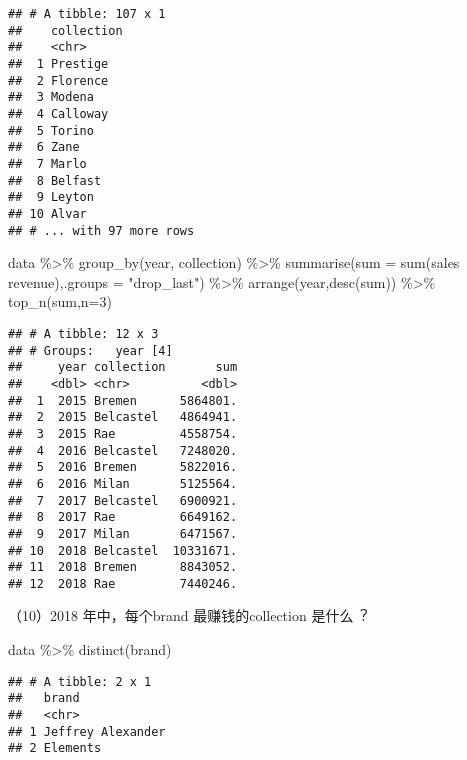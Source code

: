 \documentclass[
]{article}
\newenvironment{Shaded}{\begin{snugshade}}{\end{snugshade}}
\newcommand{\AttributeTok}[1]{\textcolor[rgb]{0.77,0.63,0.00}{#1}}
\newcommand{\DecValTok}[1]{\textcolor[rgb]{0.00,0.00,0.81}{#1}}
\newcommand{\FunctionTok}[1]{\textcolor[rgb]{0.00,0.00,0.00}{#1}}
\newcommand{\NormalTok}[1]{#1}
\newcommand{\SpecialCharTok}[1]{\textcolor[rgb]{0.00,0.00,0.00}{#1}}
\newcommand{\StringTok}[1]{\textcolor[rgb]{0.31,0.60,0.02}{#1}}
\begin{document}
\begin{verbatim}
## # A tibble: 107 x 1
##    collection
##    <chr>     
##  1 Prestige  
##  2 Florence  
##  3 Modena    
##  4 Calloway  
##  5 Torino    
##  6 Zane      
##  7 Marlo     
##  8 Belfast   
##  9 Leyton    
## 10 Alvar     
## # ... with 97 more rows
\end{verbatim}

\begin{Shaded}
\begin{Highlighting}[]
\NormalTok{data }\SpecialCharTok{\%\textgreater{}\%}
  \FunctionTok{group\_by}\NormalTok{(year, collection) }\SpecialCharTok{\%\textgreater{}\%}
  \FunctionTok{summarise}\NormalTok{(}\AttributeTok{sum =} \FunctionTok{sum}\NormalTok{(}\StringTok{\textasciigrave{}}\AttributeTok{sales revenue}\StringTok{\textasciigrave{}}\NormalTok{),}\AttributeTok{.groups =} \StringTok{"drop\_last"}\NormalTok{) }\SpecialCharTok{\%\textgreater{}\%}
  \FunctionTok{arrange}\NormalTok{(year,}\FunctionTok{desc}\NormalTok{(sum)) }\SpecialCharTok{\%\textgreater{}\%}
  \FunctionTok{top\_n}\NormalTok{(sum,}\AttributeTok{n=}\DecValTok{3}\NormalTok{)}
\end{Highlighting}
\end{Shaded}

\begin{verbatim}
## # A tibble: 12 x 3
## # Groups:   year [4]
##     year collection       sum
##    <dbl> <chr>          <dbl>
##  1  2015 Bremen      5864801.
##  2  2015 Belcastel   4864941.
##  3  2015 Rae         4558754.
##  4  2016 Belcastel   7248020.
##  5  2016 Bremen      5822016.
##  6  2016 Milan       5125564.
##  7  2017 Belcastel   6900921.
##  8  2017 Rae         6649162.
##  9  2017 Milan       6471567.
## 10  2018 Belcastel  10331671.
## 11  2018 Bremen      8843052.
## 12  2018 Rae         7440246.
\end{verbatim}

（10）2018 年中，每个brand 最赚钱的collection 是什么︖

\begin{Shaded}
\begin{Highlighting}[]
\NormalTok{data }\SpecialCharTok{\%\textgreater{}\%}
  \FunctionTok{distinct}\NormalTok{(brand)}
\end{Highlighting}
\end{Shaded}

\begin{verbatim}
## # A tibble: 2 x 1
##   brand            
##   <chr>            
## 1 Jeffrey Alexander
## 2 Elements
\end{verbatim}
\end{document}
